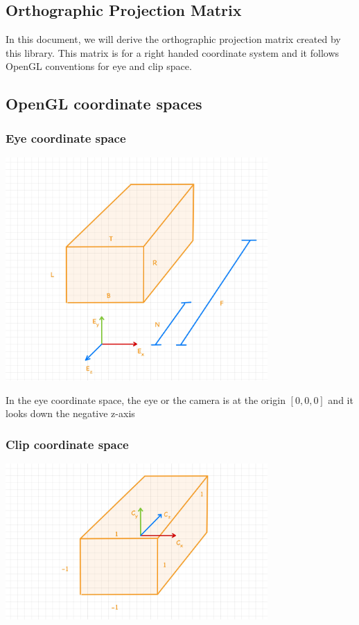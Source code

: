 \documentclass{article}
\begin{document}
    \begin{center}
        \section*{Orthographic Projection Matrix}
    \end{center}

    \noindent In this document, we will derive the orthographic projection matrix created by this library.
    This matrix is for a right handed coordinate system and it follows OpenGL conventions for eye and clip space. \break
    \subsection*{OpenGL coordinate spaces}

    \subsubsection*{Eye coordinate space}
    \includegraphics[width=0.75\textwidth]{../images/OrthoOpenGLEye.jpg}

    \noindent In the eye coordinate space, the eye or the camera is at the origin $[0,0,0]$ and it looks down the negative z-axis
    \subsubsection*{Clip coordinate space}
    \includegraphics[width=0.75\textwidth]{../images/OrthoOpenGLClip.jpg}
\end{document}
